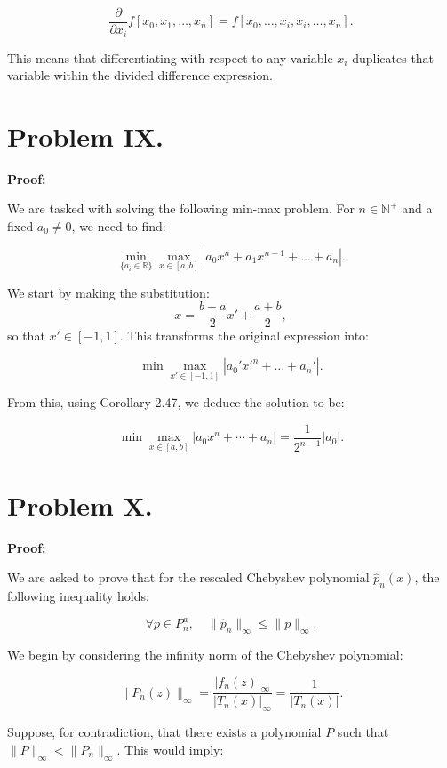 \documentclass[a4paper]{article}
\renewcommand{\qed}{\hfill \boxed{\mathbb{Q.E.D.}}}
\begin{document}
\[
\frac{\partial}{\partial x_i} f[x_0, x_1, \dots, x_n] = f[x_0, \dots, x_i, x_i, \dots, x_n].
\]

This means that differentiating with respect to any variable \(x_i\) duplicates that variable within the divided difference expression.

\qed

\section*{Problem IX.}

\textbf{Proof:}

We are tasked with solving the following min-max problem. For \( n \in \mathbb{N}^+ \) and a fixed \( a_0 \neq 0 \), we need to find:

\[
\min_{\{a_i \in \mathbb{R}\}} \max_{x \in [a, b]} \left| a_0 x^n + a_1 x^{n-1} + \dots + a_n \right|.
\]

We start by making the substitution:
\[
x = \dfrac{b-a}{2} x' + \dfrac{a+b}{2},
\]
so that \( x' \in [-1, 1] \). This transforms the original expression into:

\[
\min \max_{x' \in [-1, 1]} \left| a_0' {x'}^n + \dots + a_n' \right|.
\]

From this, using Corollary 2.47, we deduce the solution to be:

\[
\min \max_{x \in [a, b]} \left| a_0 x^n + \cdots + a_n \right| = \dfrac{1}{2^{n-1}} |a_0|.
\]

\qed

\section*{Problem X.}

\textbf{Proof:}

We are asked to prove that for the rescaled Chebyshev polynomial \( \hat{p}_n(x) \), the following inequality holds:

\[
\forall p \in P^a_n, \quad \|\hat{p}_n\|_\infty \leq \|p\|_\infty.
\]

We begin by considering the infinity norm of the Chebyshev polynomial:

\[
\| P_n(z) \|_\infty = \frac{| f_n(z) |_\infty}{| T_n(x) |_\infty} = \frac{1}{| T_n(x) |}.
\]

Suppose, for contradiction, that there exists a polynomial \( P \) such that \( \|P\|_\infty < \|P_n\|_\infty \). This would imply:
\end{document}
